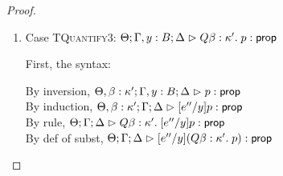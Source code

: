 \begin{proof}
\begin{enumerate}
  For semantics, consider
  $\interp{\judgeA[\Theta; \Gamma; \Delta]
                  {[e''/y](Q x:A.\;p)}{\assert}}\;\theta\;\gamma\;\delta$ 
  \begin{eqnproof}
          {Semantics}
          {Induction}
          {Semantics}
  \end{eqnproof}
  Here, we make use of the fact that $x$ is not free in $e''$, and we silently permute the context as 
  needed. 

\item Case \textsc{TQuantify3}: $\judgeA[\Theta; \Gamma, y:B; \Delta]{Q \beta:\kappa'.\;p}{\assert}$
  
  First, the syntax:
  \begin{tabbedproof}
    \oo By inversion, $\judgeA[\Theta, \beta:\kappa'; \Gamma, y:B; \Delta]{p}{\assert}$ \\
    \oo By induction, $\judgeA[\Theta, \beta:\kappa'; \Gamma; \Delta]{[e''/y]p}{\assert}$ \\
    \oo By rule, $\judgeA[\Theta; \Gamma; \Delta]
                         {Q \beta:\kappa'.\;[e''/y]p}{\assert}$ \\
    \oo By def of subst, $\judgeA[\Theta; \Gamma; \Delta]
                                 {[e''/y](Q \beta:\kappa'.\;p)}{\assert}$ 
  \end{tabbedproof}


\end{enumerate}
\end{proof}
